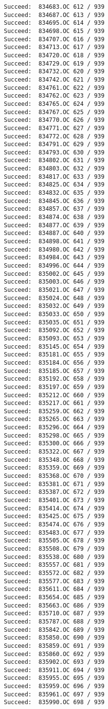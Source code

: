 \documentclass[11pt]{article}
\begin{document}
\begin{verbatim}
Succeed:  834683.OC 612 / 939
Succeed:  834687.OC 613 / 939
Succeed:  834695.OC 614 / 939
Succeed:  834698.OC 615 / 939
Succeed:  834707.OC 616 / 939
Succeed:  834713.OC 617 / 939
Succeed:  834720.OC 618 / 939
Succeed:  834729.OC 619 / 939
Succeed:  834732.OC 620 / 939
Succeed:  834742.OC 621 / 939
Succeed:  834761.OC 622 / 939
Succeed:  834762.OC 623 / 939
Succeed:  834765.OC 624 / 939
Succeed:  834767.OC 625 / 939
Succeed:  834770.OC 626 / 939
Succeed:  834771.OC 627 / 939
Succeed:  834772.OC 628 / 939
Succeed:  834791.OC 629 / 939
Succeed:  834793.OC 630 / 939
Succeed:  834802.OC 631 / 939
Succeed:  834803.OC 632 / 939
Succeed:  834817.OC 633 / 939
Succeed:  834825.OC 634 / 939
Succeed:  834832.OC 635 / 939
Succeed:  834845.OC 636 / 939
Succeed:  834857.OC 637 / 939
Succeed:  834874.OC 638 / 939
Succeed:  834877.OC 639 / 939
Succeed:  834887.OC 640 / 939
Succeed:  834898.OC 641 / 939
Succeed:  834980.OC 642 / 939
Succeed:  834984.OC 643 / 939
Succeed:  834996.OC 644 / 939
Succeed:  835002.OC 645 / 939
Succeed:  835003.OC 646 / 939
Succeed:  835021.OC 647 / 939
Succeed:  835024.OC 648 / 939
Succeed:  835032.OC 649 / 939
Succeed:  835033.OC 650 / 939
Succeed:  835035.OC 651 / 939
Succeed:  835092.OC 652 / 939
Succeed:  835093.OC 653 / 939
Succeed:  835145.OC 654 / 939
Succeed:  835181.OC 655 / 939
Succeed:  835184.OC 656 / 939
Succeed:  835185.OC 657 / 939
Succeed:  835192.OC 658 / 939
Succeed:  835197.OC 659 / 939
Succeed:  835212.OC 660 / 939
Succeed:  835217.OC 661 / 939
Succeed:  835259.OC 662 / 939
Succeed:  835265.OC 663 / 939
Succeed:  835296.OC 664 / 939
Succeed:  835298.OC 665 / 939
Succeed:  835300.OC 666 / 939
Succeed:  835322.OC 667 / 939
Succeed:  835348.OC 668 / 939
Succeed:  835359.OC 669 / 939
Succeed:  835368.OC 670 / 939
Succeed:  835381.OC 671 / 939
Succeed:  835387.OC 672 / 939
Succeed:  835401.OC 673 / 939
Succeed:  835414.OC 674 / 939
Succeed:  835425.OC 675 / 939
Succeed:  835474.OC 676 / 939
Succeed:  835483.OC 677 / 939
Succeed:  835505.OC 678 / 939
Succeed:  835508.OC 679 / 939
Succeed:  835538.OC 680 / 939
Succeed:  835557.OC 681 / 939
Succeed:  835572.OC 682 / 939
Succeed:  835577.OC 683 / 939
Succeed:  835611.OC 684 / 939
Succeed:  835654.OC 685 / 939
Succeed:  835663.OC 686 / 939
Succeed:  835710.OC 687 / 939
Succeed:  835787.OC 688 / 939
Succeed:  835842.OC 689 / 939
Succeed:  835850.OC 690 / 939
Succeed:  835859.OC 691 / 939
Succeed:  835860.OC 692 / 939
Succeed:  835902.OC 693 / 939
Succeed:  835911.OC 694 / 939
Succeed:  835955.OC 695 / 939
Succeed:  835959.OC 696 / 939
Succeed:  835961.OC 697 / 939
Succeed:  835990.OC 698 / 939

\end{verbatim}
\end{document}
